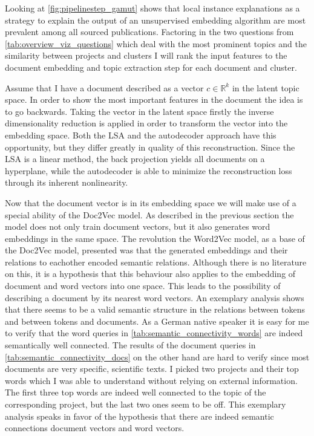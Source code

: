 Looking at \autoref{fig:pipelinestep_gamut} shows that local instance explanations as a strategy to explain the output of an unsupervised embedding algorithm are most prevalent among all sourced publications. Factoring in the two questions from \autoref{tab:overview_viz_questions} which deal with the most prominent topics and the similarity between projects and clusters I will rank the input features to the document embedding and topic extraction step for each document and cluster. 

Assume that I have a document described as a vector $c \in \mathbb{R}^k$ in the latent topic space. In order to show the most important features in the document the idea is to go backwards. Taking the vector in the latent space firstly the inverse dimensionality reduction is applied in order to transform the vector into the embedding space. Both the LSA and the autodecoder approach have this opportunity, but they differ greatly in quality of this reconstruction. Since the LSA is a linear method, the back projection yields all documents on a hyperplane, while the autodecoder is able to minimize the reconstruction loss through its inherent nonlinearity. 

Now that the document vector is in its embedding space we will make use of a special ability of the Doc2Vec model. As described in the previous section the model does not only train document vectors, but it also generates word embeddings in the same space. The revolution the Word2Vec model, as a base of the Doc2Vec model, presented was that the generated embeddings and their relations to eachother encoded semantic relations. Although there is no literature on this, it is a hypothesis that this behaviour also applies to the embedding of document and word vectors into one space. This leads to the possibility of describing a document by its nearest word vectors. An exemplary analysis shows that there seems to be a valid semantic structure in the relations between tokens and between tokens and documents. As a German native speaker it is easy for me to verify that the word queries in \autoref{tab:semantic_connectivity_words} are indeed semantically well connected. The results of the document queries in \autoref{tab:semantic_connectivity_docs} on the other hand are hard to verify since most documents are very specific, scientific texts. I picked two projects and their top words which I was able to understand without relying on external information. The first three top words are indeed well connected to the topic of the corresponding project, but the last two ones seem to be off. This exemplary analysis speaks in favor of the hypothesis that there are indeed semantic connections document vectors and word vectors.


